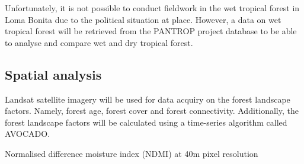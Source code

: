 Unfortunately, it is not possible to conduct fieldwork in the wet tropical forest in Loma Bonita due to the political situation at place. However, a data on wet tropical forest will be retrieved from the PANTROP project database to be able to analyse and compare wet and dry tropical forest.

\subsection{Spatial analysis}
Landsat satellite imagery will be used for data acquiry on the forest landscape factors. Namely, forest age, forest cover and forest connectivity. Additionally, the forest landscape factors will be calculated using a time-series algorithm called AVOCADO.

Normalised difference moisture index (NDMI) at 40m pixel resolution
 